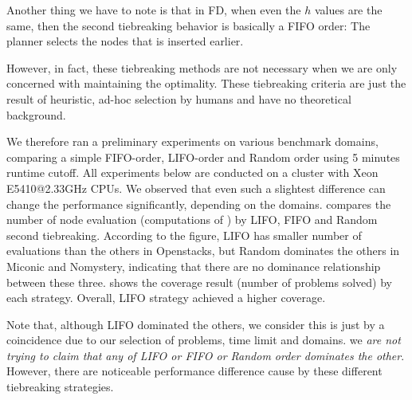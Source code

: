 Another thing we have to note is that in FD, when even the $h$ values are the same, then the second tiebreaking behavior is basically a FIFO order: The planner selects the nodes that is inserted earlier. 

However, in fact, these tiebreaking methods are not necessary when we are only concerned with  maintaining the optimality. These tiebreaking criteria are just the result of heuristic, ad-hoc selection by humans and have no theoretical background.

We therefore ran a preliminary experiments on various benchmark domains, comparing a simple FIFO-order, LIFO-order and Random order using 5 minutes runtime cutoff. 
All experiments below are conducted on a cluster with Xeon E5410@2.33GHz CPUs.
We observed that even such a slightest difference can change the performance significantly, depending on the domains.
 compares the number of node evaluation (computations of \lmcut)
by LIFO, FIFO and Random second tiebreaking.
According to the figure, LIFO has smaller number of evaluations than the others in Openstacks, but Random dominates the others in Miconic and Nomystery, indicating that there are no dominance relationship between these three.
 shows the coverage result (number of problems solved) by each strategy.
Overall, LIFO strategy achieved a higher coverage.

Note that, although LIFO dominated the others, we consider this is just by a coincidence due to our selection of problems, time limit and domains. we \emph{are not trying to claim that any of LIFO or FIFO or Random order dominates the other}. However, there are noticeable performance difference cause by these different tiebreaking strategies.


